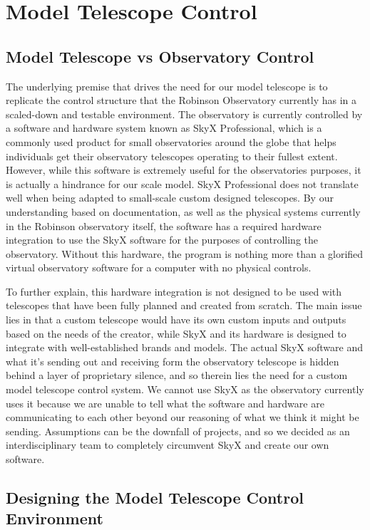 \documentclass[12pt]{report}
\begin{document}
\section*{Model Telescope Control}

\subsection*{Model Telescope vs Observatory Control}

The underlying premise that drives the need for our model telescope is to replicate the control structure that the Robinson Observatory currently has in a scaled-down and testable environment. The observatory is currently controlled by a software and hardware system known as SkyX Professional, which is a commonly used product for small observatories around the globe that helps individuals get their observatory telescopes operating to their fullest extent. However, while this software is extremely useful for the observatories purposes, it is actually a hindrance for our scale model. SkyX Professional does not translate well when being adapted to small-scale custom designed telescopes. By our understanding based on documentation, as well as the physical systems currently in the Robinson observatory itself, the software has a required hardware integration to use the SkyX software for the purposes of controlling the observatory. Without this hardware, the program is nothing more than a glorified virtual observatory software for a computer with no physical controls.

To further explain, this hardware integration is not designed to be used with telescopes that have been fully planned and created from scratch. The main issue lies in that a custom telescope would have its own custom inputs and outputs based on the needs of the creator, while SkyX and its hardware is designed to integrate with well-established brands and models. The actual SkyX software and what it’s sending out and receiving form the observatory telescope is hidden behind a layer of proprietary silence, and so therein lies the need for a custom model telescope control system. We cannot use SkyX as the observatory currently uses it because we are unable to tell what the software and hardware are communicating to each other beyond our reasoning of what we think it might be sending. Assumptions can be the downfall of projects, and so we decided as an interdisciplinary team to completely circumvent SkyX and create our own software.

\subsection*{Designing the Model Telescope Control Environment}
\end{document}
